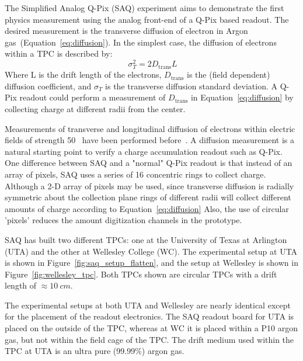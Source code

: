 The Simplified Analog Q-Pix (SAQ) experiment aims to demonstrate the first physics measurement using the analog front-end of a Q-Pix based readout.
The desired measurement is the transverse diffusion of electron in Argon gas~(Equation~\ref{eq:diffusion}).
In the simplest case, the diffusion of electrons within a TPC is described by:
\begin{equation}~\label{eq:diffusion}
 \sigma^{2}_{T} = 2D_{\mathrm{trans}}L
\end{equation}
Where L is the drift length of the electrons, $D_{\mathrm{trans}}$ is the (field dependent) diffusion coefficient, and $\sigma_{T}$ is the transverse diffusion standard deviation.
A Q-Pix readout could perform a measurement of $D_{\mathrm{trans}}$ in Equation~\ref{eq:diffusion} by collecting charge at different radii from the center.

Measurements of transverse and longitudinal diffusion of electrons within electric fields of strength 50~\unit{} have been performed before~\citep{lar_diffusion_measurement_LI2016160}.
A diffusion measurement is a natural starting point to verify a charge accumulation readout such as Q-Pix.
One difference between SAQ and a "normal" Q-Pix readout is that instead of an array of pixels, SAQ uses a series of 16 concentric rings to collect charge.
Although a 2-D array of pixels may be used, since transverse diffusion is radially symmetric about the collection plane rings of different radii will collect different amounts of charge according to Equation~\ref{eq:diffusion}
Also, the use of circular 'pixels' reduces the amount digitization channels in the prototype.

SAQ has built two different TPCs: one at the University of Texas at Arlington (UTA) and the other at Wellesley College (WC).
The experimental setup at UTA is shown in Figure~\ref{fig:saq_setup_flatten}, and the setup at Wellesley is shown in Figure~\ref{fig:wellesley_tpc}.
Both TPCs shown are circular TPCs with a drift length of $\approx 10~\unit{cm}$.

The experimental setups at both UTA and Wellesley are nearly identical except for the placement of the readout electronics.
The SAQ readout board for UTA is placed on the outside of the TPC, whereas at WC it is placed within a P10 argon gas, but not within the field cage of the TPC.
The drift medium used within the TPC at UTA is an ultra pure (99.99\%) argon gas.

